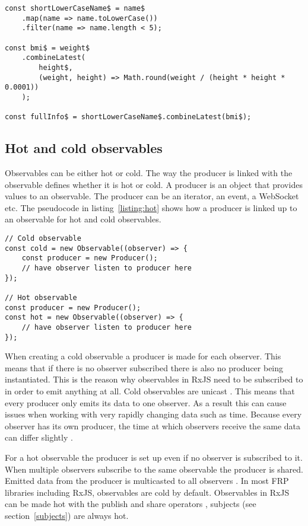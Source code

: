 \begin{lstlisting}[caption=Reactive BMI calculator source code \cite{debug},label=listing:bmi]
const shortLowerCaseName$ = name$
	.map(name => name.toLowerCase())
	.filter(name => name.length < 5);

const bmi$ = weight$
	.combineLatest(
		height$,
		(weight, height) => Math.round(weight / (height * height * 0.0001))
	);

const fullInfo$ = shortLowerCaseName$.combineLatest(bmi$);
\end{lstlisting}

\subsection{Hot and cold observables}

Observables can be either hot or cold. The way the producer is linked with the observable defines whether it is hot or cold. A producer is an object that provides values to an observable. The producer can be an iterator, an event, a WebSocket etc. The pseudocode in listing~\ref{listing:hot} shows how a producer is linked up to an observable for hot and cold observables.

\begin{lstlisting}[caption=Hot and cold observables in RxJS \cite{hot},label=listing:hot]
// Cold observable
const cold = new Observable((observer) => {
	const producer = new Producer();
	// have observer listen to producer here
});

// Hot observable
const producer = new Producer();
const hot = new Observable((observer) => {
	// have observer listen to producer here
});
\end{lstlisting}

When creating a cold observable a producer is made for each observer. This means that if there is no observer subscribed there is also no producer being instantiated. This is the reason why observables in RxJS need to be subscribed to in order to emit anything at all. Cold observables are unicast \cite{hot}. This means that every producer only emits its data to one observer. As a result this can cause issues when working with very rapidly changing data such as time. Because every observer has its own producer, the time at which observers receive the same data can differ slightly \cite{hot}.

For a hot observable the producer is set up even if no observer is subscribed to it. When multiple observers subscribe to the same observable the producer is shared. Emitted data from the producer is multicasted to all observers \cite{hot}. In most FRP libraries including RxJS, observables are cold by default. Observables in RxJS can be made hot with the publish and share operators \cite{hot}, subjects (see section~\ref{subjects}) are always hot.


